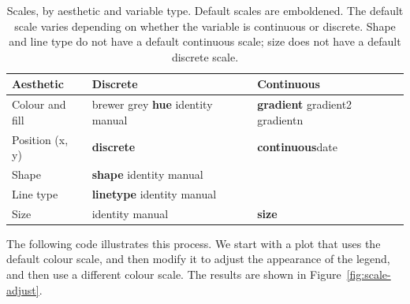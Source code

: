 \begin{table}
  \begin{center}
  \begin{tabular}{p{1in}p{1in}p{1in}}
    \toprule
    Aesthetic & Discrete & Continuous \\
    \midrule
    Colour and fill & brewer \newline grey \newline \textbf{hue} \newline identity \newline manual & \textbf{gradient} \newline gradient2 \newline gradientn \\[0.5em]
    Position (x, y) & \textbf{discrete} & \textbf{continuous}\newline date \\[0.5em]
    Shape & \textbf{shape} \newline identity \newline manual  \\[0.5em]
    Line type & \textbf{linetype} \newline identity \newline manual \\[0.5em]
    Size & identity \newline manual & \textbf{size} \\
    \bottomrule
  \end{tabular}
  \end{center}
  \caption{Scales, by aesthetic and variable type.  Default scales are emboldened. The default scale varies depending on whether the variable is continuous or discrete.  Shape and line type do not have a default continuous scale; size does not have a default discrete scale.}
  \label{tbl:default-scales}
\end{table}

The following code illustrates this process.  We start with a plot that uses the default colour scale, and then modify it to adjust the appearance of the legend, and then use a different colour scale.  The results are shown in Figure~\ref{fig:scale-adjust}.

% 
% 
% 


